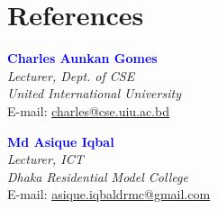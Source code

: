 \documentclass[10pt,a4paper]{article}
\begin{document}
\section*{References}
\begin{minipage}[t]{0.48\textwidth}
\textcolor{blue}{\textbf{Charles Aunkan Gomes}}\\
\textit{Lecturer, Dept. of CSE}\\
\textit{United International University}\\
E-mail: \href{mailto:charles@cse.uiu.ac.bd}{charles@cse.uiu.ac.bd}
\end{minipage}
\hfill
\begin{minipage}[t]{0.48\textwidth}
\textcolor{blue}{\textbf{Md Asique Iqbal}}\\
\textit{Lecturer, ICT}\\
\textit{Dhaka Residential Model College}\\
E-mail: \href{mailto:asique.iqbaldrmc@gmail.com}{asique.iqbaldrmc@gmail.com}
\end{minipage}
\end{document}
